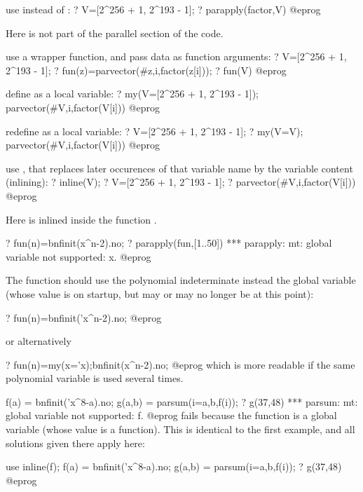 \item use  instead of :
\bprog
? V=[2^256 + 1, 2^193 - 1];
? parapply(factor,V)
@eprog

Here  is not part of the parallel section of the code.

\item use a wrapper function, and pass data as function arguments:
\bprog
? V=[2^256 + 1, 2^193 - 1];
? fun(z)=parvector(#z,i,factor(z[i]));
? fun(V)
@eprog

\item define  as a local variable:
\bprog
? my(V=[2^256 + 1, 2^193 - 1]); parvector(#V,i,factor(V[i]))
@eprog

\item redefine  as a local variable:
\bprog
? V=[2^256 + 1, 2^193 - 1];
? my(V=V); parvector(#V,i,factor(V[i]))
@eprog

\item use , that replaces later occurences of that variable name
  by the variable content (inlining):
\bprog
? inline(V);
? V=[2^256 + 1, 2^193 - 1];
? parvector(#V,i,factor(V[i]))
@eprog

Here  is inlined inside the function .


\bprog
? fun(n)=bnfinit(x^n-2).no;
? parapply(fun,[1..50])
  *** parapply: mt: global variable not supported: x.
@eprog

The function  should use the polynomial indeterminate 
instead the global variable  (whose value is  on startup, but
may or may no longer be  at this point):

\bprog
? fun(n)=bnfinit('x^n-2).no;
@eprog

or alternatively

\bprog
? fun(n)=my(x='x);bnfinit(x^n-2).no;
@eprog
which is more readable if the same polynomial variable is used several times.

\bprog
f(a) = bnfinit('x^8-a).no;
g(a,b) = parsum(i=a,b,f(i));
? g(37,48)
  *** parsum: mt: global variable not supported: f.
@eprog\noindent
fails because the function  is a global variable (whose value is a
function).  This is identical to the first example, and all solutions given
there apply here:

\item use 
\bprog
inline(f);
f(a) = bnfinit('x^8-a).no;
g(a,b) = parsum(i=a,b,f(i));
? g(37,48)
@eprog

